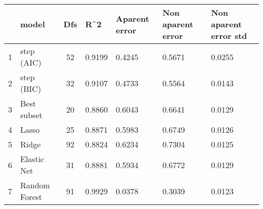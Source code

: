 \begin{tabular}{c|p{3cm}|c|p{2cm}|p{2cm}|p{2cm}|p{2cm}}
\toprule
{} &          model &  Dfs &    R\textasciicircum 2 &  Aparent error &  Non aparent error &  Non aparent error std \\
\midrule
1 &     step (AIC) &   52 & 0.9199 &         0.4245 &             0.5671 &                 0.0255 \\
2 &     step (BIC) &   32 & 0.9107 &         0.4733 &             0.5564 &                 0.0143 \\
3 &    Best subset &   20 & 0.8860 &         0.6043 &             0.6641 &                 0.0129 \\
4 &          Lasso &   25 & 0.8871 &         0.5983 &             0.6749 &                 0.0126 \\
5 &          Ridge &   92 & 0.8824 &         0.6234 &             0.7304 &                 0.0125 \\
6 &    Elastic Net &   31 & 0.8881 &         0.5934 &             0.6772 &                 0.0129 \\
7 &  Random Forest &   91 & 0.9929 &         0.0378 &             0.3039 &                 0.0123 \\
\bottomrule
\end{tabular}
